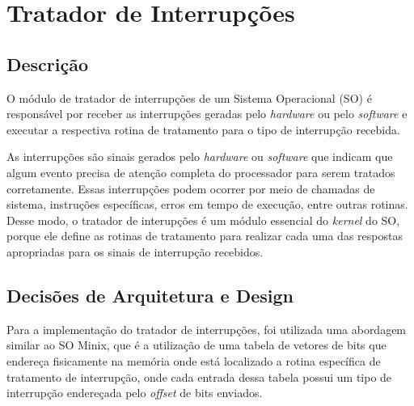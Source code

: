 \chapter{Tratador de Interrupções}



\section{Descrição}
%
O módulo de tratador de interrupções de um Sistema Operacional (SO) é responsável por receber as interrupções geradas pelo \emph{hardware} ou pelo \emph{software} e executar a respectiva rotina de tratamento para o tipo de interrupção recebida.

As interrupções são sinais gerados pelo \emph{hardware} ou \emph{software} que indicam que algum evento precisa de atenção completa do processador para serem tratados corretamente. Essas interrupções podem ocorrer por meio de chamadas de sistema, instruções específicas, erros em tempo de execução, entre outras rotinas. Desse modo, o tratador de interupções é um módulo essencial do \emph{kernel} do SO, porque ele define as rotinas de tratamento para realizar cada uma das respostas apropriadas para os sinais de interrupção recebidos.


\section{Decisões de Arquitetura e Design}
%
%
Para a implementação do tratador de interrupções, foi utilizada uma abordagem similar ao SO Minix, que é a utilização de uma tabela de vetores de bits que endereça fisicamente na memória onde está localizado a rotina específica de tratamento de interrupção, onde cada entrada dessa tabela possui um tipo de interrupção endereçada pelo \emph{offset} de bits enviados.

